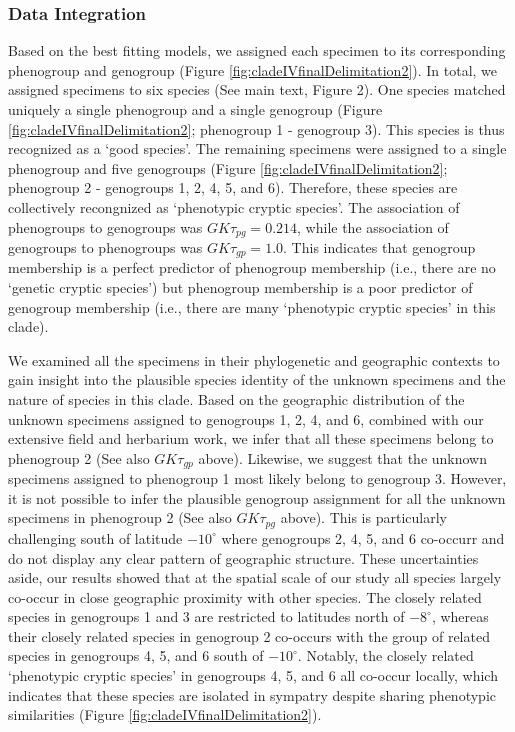 \documentclass[
  11pt,
]{article}
\begin{document}
\hypertarget{data-integration-4}{%
\subsubsection{Data Integration}\label{data-integration-4}}

Based on the best fitting models, we assigned each specimen to its corresponding phenogroup and genogroup (Figure \ref{fig:cladeIVfinalDelimitation2}). In total, we assigned specimens to six species (See main text, Figure 2). One species matched uniquely a single phenogroup and a single genogroup (Figure \ref{fig:cladeIVfinalDelimitation2}; phenogroup 1 - genogroup 3). This species is thus recognized as a `good species'. The remaining specimens were assigned to a single phenogroup and five genogroups (Figure \ref{fig:cladeIVfinalDelimitation2}; phenogroup 2 - genogroups 1, 2, 4, 5, and 6). Therefore, these species are collectively recongnized as `phenotypic cryptic species'. The association of phenogroups to genogroups was \(GK\tau_{pg}= 0.214\), while the association of genogroups to phenogroups was \(GK\tau_{gp}= 1.0\). This indicates that genogroup membership is a perfect predictor of phenogroup membership (i.e., there are no `genetic cryptic species') but phenogroup membership is a poor predictor of genogroup membership (i.e., there are many `phenotypic cryptic species' in this clade).

We examined all the specimens in their phylogenetic and geographic contexts to gain insight into the plausible species identity of the unknown specimens and the nature of species in this clade. Based on the geographic distribution of the unknown specimens assigned to genogroups 1, 2, 4, and 6, combined with our extensive field and herbarium work, we infer that all these specimens belong to phenogroup 2 (See also \(GK\tau_{gp}\) above). Likewise, we suggest that the unknown specimens assigned to phenogroup 1 most likely belong to genogroup 3. However, it is not possible to infer the plausible genogroup assignment for all the unknown specimens in phenogroup 2 (See also \(GK\tau_{pg}\) above). This is particularly challenging south of latitude \(-10^\circ\) where genogroups 2, 4, 5, and 6 co-occurr and do not display any clear pattern of geographic structure. These uncertainties aside, our results showed that at the spatial scale of our study all species largely co-occur in close geographic proximity with other species. The closely related species in genogroups 1 and 3 are restricted to latitudes north of \(-8^\circ\), whereas their closely related species in genogroup 2 co-occurs with the group of related species in genogroups 4, 5, and 6 south of \(-10^\circ\). Notably, the closely related `phenotypic cryptic species' in genogroups 4, 5, and 6 all co-occur locally, which indicates that these species are isolated in sympatry despite sharing phenotypic similarities (Figure \ref{fig:cladeIVfinalDelimitation2}).
\end{document}
